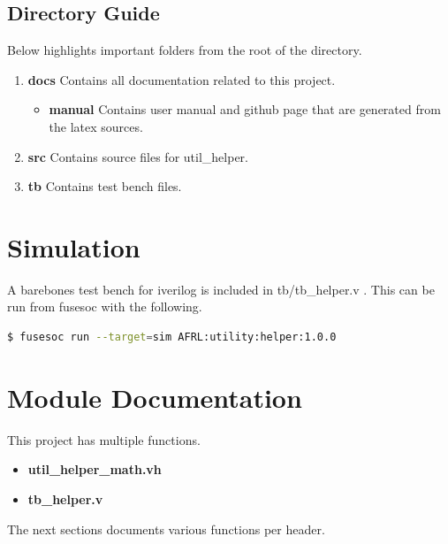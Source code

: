 

\subsection{Directory Guide}

\par
Below highlights important folders from the root of the directory.

\begin{enumerate}
  \item \textbf{docs} Contains all documentation related to this project.
    \begin{itemize}
      \item \textbf{manual} Contains user manual and github page that are generated from the latex sources.
    \end{itemize}
  \item \textbf{src} Contains source files for util\_helper.
  \item \textbf{tb} Contains test bench files.
\end{enumerate}

\newpage

\section{Simulation}
\par
A barebones test bench for iverilog is included in tb/tb\_helper.v . This can be run from fusesoc with the following.
\begin{lstlisting}[language=bash]
$ fusesoc run --target=sim AFRL:utility:helper:1.0.0
\end{lstlisting}

\newpage

\section{Module Documentation} \label{Module Documentation}

\par
This project has multiple functions.

\begin{itemize}
\item \textbf{util\_helper\_math.vh}
\item \textbf{tb\_helper.v}
\end{itemize}
The next sections documents various functions per header.


